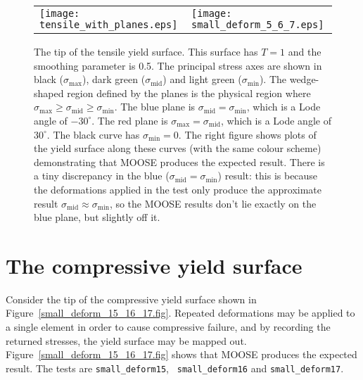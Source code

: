 \documentclass[]{scrreprt}
\newcommand{\smax}{\sigma_{\mathrm{max}}}
\newcommand{\smid}{\sigma_{\mathrm{mid}}}
\newcommand{\smin}{\sigma_{\mathrm{min}}}
\begin{document}
\begin{figure}[htb]
  \begin{center}
    \begin{tabular}{ll}
      \texttt{[image: tensile\_with\_planes.eps]} &
      \texttt{[image: small\_deform\_5\_6\_7.eps]}
    \end{tabular}
\caption{The tip of the tensile yield surface.  This surface has $T=1$
  and the smoothing parameter is 0.5.  The
  principal stress axes are shown in black ($\smax$), dark green
  ($\smid$) and light green ($\smin$).  The wedge-shaped region
  defined by the planes is the physical region where
  $\smax\geq\smid\geq\smin$.  The blue plane is $\smid=\smin$, which
  is a Lode angle of $-30^{\circ}$.  The red plane is $\smax=\smid$,
  which is a Lode angle of $30^{\circ}$.  The black curve has
  $\smin=0$.  The right figure shows plots of the yield surface along
  these curves (with the same colour scheme) demonstrating that MOOSE
  produces the expected result.  There is a tiny discrepancy in the
  blue ($\smid=\smin$) result: this is because the deformations
  applied in the test only produce the approximate result
  $\smid\approx\smin$, so the MOOSE results don't lie exactly on the
  blue plane, but slightly off it.}
\label{small_deform_5_6_7.fig}
\end{center}
\end{figure}

\section{The compressive yield surface}

Consider the tip of the compressive yield surface shown in
Figure~\ref{small_deform_15_16_17.fig}.  Repeated deformations may be
applied to a single element in order to cause compressive failure, and by
recording the returned stresses, the yield surface may be mapped out.
Figure~\ref{small_deform_15_16_17.fig} shows that MOOSE produces the
expected result.  The tests are {\tt small\_deform15}, {\tt
  small\_deform16} and {\tt small\_deform17}.
\end{document}
